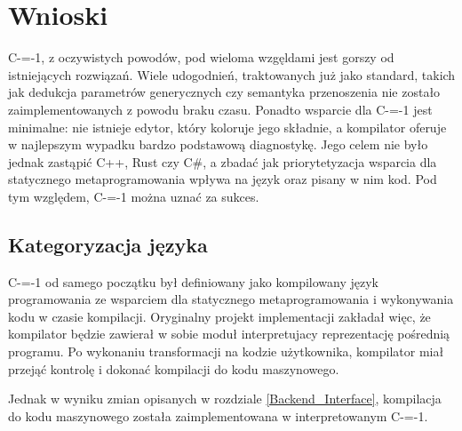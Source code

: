 \section{Wnioski}

C-=-1, z oczywistych powodów, pod wieloma wzgęldami jest gorszy od istniejących rozwiązań.
Wiele udogodnień, traktowanych już jako standard, takich jak dedukcja parametrów generycznych czy semantyka przenoszenia nie zostało zaimplementowanych z powodu braku czasu.
Ponadto wsparcie dla C-=-1 jest minimalne: nie istnieje edytor, który koloruje jego składnie, a kompilator oferuje w najlepszym wypadku bardzo podstawową diagnostykę.
Jego celem nie było jednak zastąpić C++, Rust czy C\#, a zbadać jak priorytetyzacja wsparcia dla statycznego metaprogramowania wpływa na język oraz pisany w nim kod. 
Pod tym względem, C-=-1 można uznać za sukces.



\subsection{Kategoryzacja języka}

C-=-1 od samego początku był definiowany jako kompilowany język programowania ze wsparciem dla statycznego metaprogramowania i wykonywania kodu w czasie kompilacji.
Oryginalny projekt implementacji zakładał więc, że kompilator będzie zawierał w sobie moduł interpretujacy reprezentację pośrednią programu.
Po wykonaniu transformacji na kodzie użytkownika, kompilator miał przejąć kontrolę i dokonać kompilacji do kodu maszynowego.

Jednak w wyniku zmian opisanych w rozdziale \ref{Backend_Interface}, kompilacja do kodu maszynowego została zaimplementowana w interpretowanym C-=-1.


